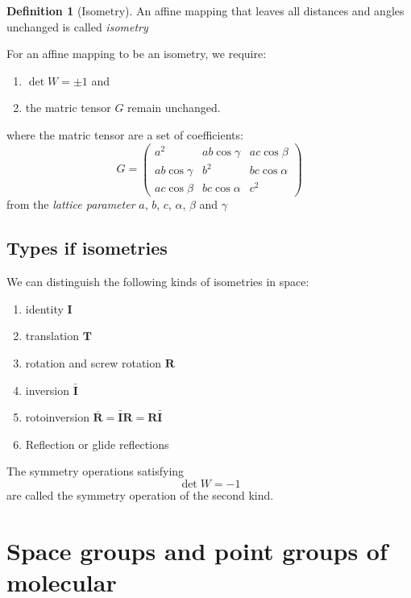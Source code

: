 \documentclass{amsart}
\theoremstyle{remark}
\theoremstyle{remark}
\theoremstyle{definition}
\newtheorem*{definition}{Definition}
\begin{document}
\begin{definition}
    [Isometry]
    An affine mapping that leaves all distances and angles unchanged is called \emph{isometry}
\end{definition}
For an affine mapping to be an isometry, we require: 
\begin{enumerate}
    \item $\det W = \pm 1$ and 
    \item the matric tensor $G$ remain unchanged.
\end{enumerate}
where the matric tensor are a set of coefficients:
\begin{equation*}
    G = \left(\begin{matrix}
        a^2 & ab\cos\gamma & ac\cos\beta \\
        ab\cos\gamma & b^2 & bc\cos\alpha \\
        ac\cos\beta & bc\cos\alpha & c^2 
    \end{matrix}\right)
\end{equation*}
from the \emph{lattice parameter} $a$, $b$, $c$, $\alpha$, $\beta$ and $\gamma$

\vspace{10pt}

\subsection*{Types if isometries}
We can distinguish the following kinds of isometries in space:
\begin{enumerate}
    \item identity $\mathbf{I}$
    \item translation $\mathbf{T}$
    \item rotation and screw rotation $\mathbf{R}$
    \item inversion $\bar{\mathbf{I}}$
    \item rotoinversion $\overline{\mathbf{R}} = \bar{\mathbf{I}} \mathbf{R} = \mathbf{R} \bar{\mathbf{I}}$
    \item Reflection or glide reflections
\end{enumerate}
The symmetry operations satisfying \[\det W = -1\] are called the symmetry operation of the second kind.

\vspace{10pt}
\section*{Space groups and point groups of molecular}
\end{document}
